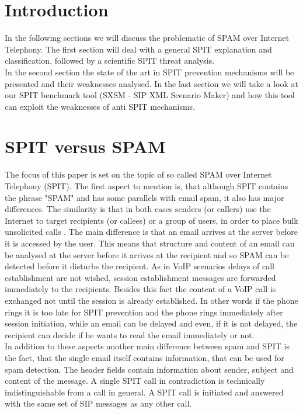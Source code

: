 \documentclass[final
	]{issa}
\begin{document}
\maketitle               

\section{Introduction}
In the following sections we will discuss the problematic of SPAM over Internet Telephony. The first section will deal with a general SPIT explanation and classification, followed by a scientific SPIT threat analysis.\\
In the second section the state of the art in SPIT prevention mechanisms will be presented 
and their weaknesses analysed. In the last section we will take a look at our SPIT 
benchmark tool (SXSM - SIP XML Scenario Maker) and how this tool can exploit the weaknesses 
of anti SPIT mechanisms.



\section{SPIT versus SPAM}
The focus of this paper is set on the topic of so called SPAM over Internet Telephony (SPIT). The first aspect to mention is, that although SPIT contains the phrase "SPAM" and has some parallels with email spam, it also has major differences. The similarity is that in both cases senders (or callers) use the Internet to target recipients (or callees) or a group of users, in order to place bulk unsolicited calls \cite{paper:SPITieee}. The main difference is that an email arrives at the server before it is accessed by the user. This means that structure and content of an email can be analysed at the server before it arrives at the recipient and so SPAM can be detected before it disturbs the recipient. As in VoIP scenarios delays of call establishment are not wished, session establishment messages are forwarded immediately to the recipients. Besides this fact the content of a VoIP call is exchanged not until the session is already established. In other words if the phone rings it is too late for SPIT prevention and the phone rings immediately after session initiation, while an email can be delayed and even, if it is not delayed, the recipient can decide if he wants to read the email immediately or not.\\
In addition to these aspects another main difference between spam and SPIT is the fact, that the single email itself contains information, that can be used for spam detection. The header fields contain information about sender, subject and content of the message. A single SPIT call in contradiction is technically indistinguishable from a call in general. A SPIT call is initiated and answered with the same set of SIP messages as any other call.
\end{document}
